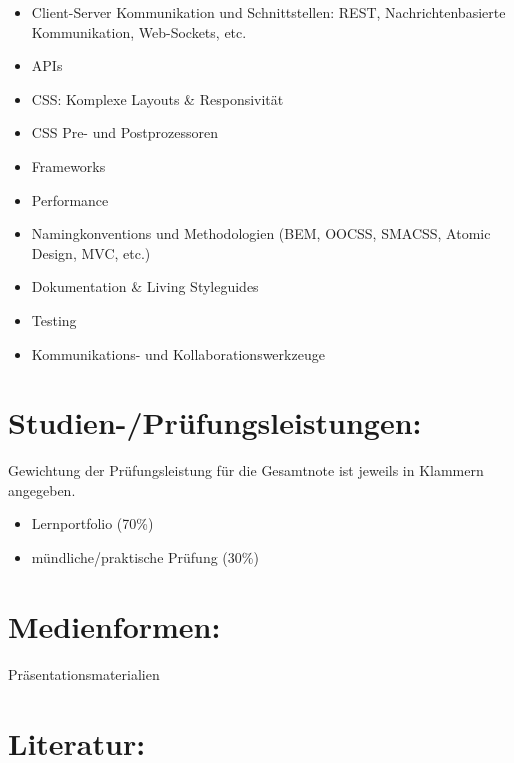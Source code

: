 \begin{itemize}
\tightlist
\item
  Client-Server Kommunikation und Schnittstellen: REST,
  Nachrichtenbasierte Kommunikation, Web-Sockets, etc.
\item
  APIs
\item
  CSS: Komplexe Layouts \& Responsivität
\item
  CSS Pre- und Postprozessoren
\item
  Frameworks
\item
  Performance
\item
  Namingkonventions und Methodologien (BEM, OOCSS, SMACSS, Atomic
  Design, MVC, etc.)
\item
  Dokumentation \& Living Styleguides
\item
  Testing
\item
  Kommunikations- und Kollaborationswerkzeuge
\end{itemize}

\section*{Studien-/Prüfungsleistungen:\label{/mi-2017/modulbeschreibungen-master/MA_WTW_Modul_Web-Technologien}}\label{studien-pruxfcfungsleistungenpathlabelmi-2017modulbeschreibungen-mastermaux5fwtwux5fmodulux5fweb-technologien}

Gewichtung der Prüfungsleistung für die Gesamtnote ist jeweils in
Klammern angegeben.

\begin{itemize}
\tightlist
\item
  Lernportfolio (70\%)
\item
  mündliche/praktische Prüfung (30\%)
\end{itemize}

\section*{Medienformen:\label{/mi-2017/modulbeschreibungen-master/MA_WTW_Modul_Web-Technologien}}\label{medienformenpathlabelmi-2017modulbeschreibungen-mastermaux5fwtwux5fmodulux5fweb-technologien}

Präsentationsmaterialien

\section*{Literatur:\label{/mi-2017/modulbeschreibungen-master/MA_WTW_Modul_Web-Technologien}}\label{literaturpathlabelmi-2017modulbeschreibungen-mastermaux5fwtwux5fmodulux5fweb-technologien}

